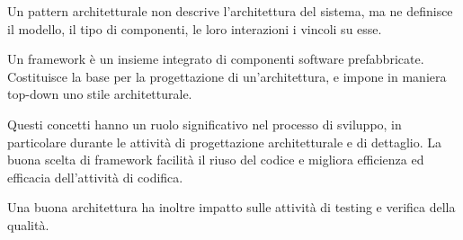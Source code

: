 Un pattern architetturale non descrive l'architettura del sistema, ma ne
definisce il modello, il tipo di componenti, le loro interazioni i vincoli su
esse.

Un framework è un insieme integrato di componenti software prefabbricate.
Costituisce la base per la progettazione  di
un'architettura, e impone in maniera top-down uno stile architetturale.

Questi concetti hanno un ruolo significativo nel processo di sviluppo, in
particolare durante le attività di progettazione architetturale e di dettaglio.
La buona scelta di framework facilità il riuso del codice e migliora
efficienza ed efficacia dell'attività di codifica.

Una buona architettura ha inoltre impatto sulle attività di testing e verifica
della qualità.
